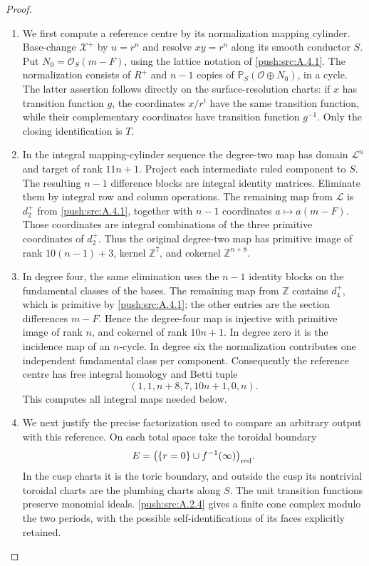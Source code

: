 \begin{proof}
\begin{enumerate}[label=\arabic*.,leftmargin=*]
\item We first compute a reference centre by its normalization
mapping cylinder. Base-change $\mathcal X^+$ by $u=r^n$
and resolve $xy=r^n$ along its smooth conductor $S$.
Put $N_0=\mathcal O_S(m-F)$, using the lattice notation
of \ref{push:src:A.4.1}. The normalization consists of $R^+$ and
$n-1$ copies of $\mathbb P_S(\mathcal O\oplus N_0)$,
in a cycle. The latter assertion follows directly on
the surface-resolution charts: if $x$ has transition
function $g$, the coordinates $x/r^i$ have the same
transition function, while their complementary
coordinates have transition function $g^{-1}$.
Only the closing identification is $T$.

\item In the integral mapping-cylinder sequence the degree-two
map has domain $\mathcal L^n$ and target of rank $11n+1$.
Project each intermediate ruled component to $S$.
The resulting $n-1$ difference blocks are integral
identity matrices. Eliminate them by integral row and
column operations. The remaining map from $\mathcal L$
is $d_2^+$ from \ref{push:src:A.4.1}, together with $n-1$ coordinates
$a\mapsto a(m-F)$. Those coordinates are integral
combinations of the three primitive coordinates of
$d_2^+$. Thus the original degree-two map has primitive
image of rank $10(n-1)+3$, kernel $\mathbb Z^7$, and
cokernel $\mathbb Z^{n+8}$.

\item In degree four, the same elimination uses the $n-1$
identity blocks on the fundamental classes of the bases.
The remaining map from $\mathbb Z$ contains $d_4^+$,
which is primitive by \ref{push:src:A.4.1}; the other entries are the
section differences $m-F$. Hence the degree-four map
is injective with primitive image of rank $n$, and
cokernel of rank $10n+1$. In degree zero it is the
incidence map of an $n$-cycle. In degree six the
normalization contributes one independent fundamental
class per component. Consequently the reference centre
has free integral homology and Betti tuple
\[
 (1,1,n+8,7,10n+1,0,n).
\]
This computes all integral maps needed below.

\item We next justify the precise factorization used to compare
an arbitrary output with this reference. On each total
space take the toroidal boundary
\[
 E=\bigl(\{r=0\}\cup f^{-1}(\infty)\bigr)_{\rm red}.
\]
In the cusp charts it is the toric boundary, and outside
the cusp its nontrivial toroidal charts are the plumbing
charts along $S$. The unit transition functions preserve
monomial ideals. \ref{push:src:A.2.4} gives a finite cone complex modulo
the two periods, with the possible self-identifications
of its faces explicitly retained.


\end{enumerate}
\end{proof}
